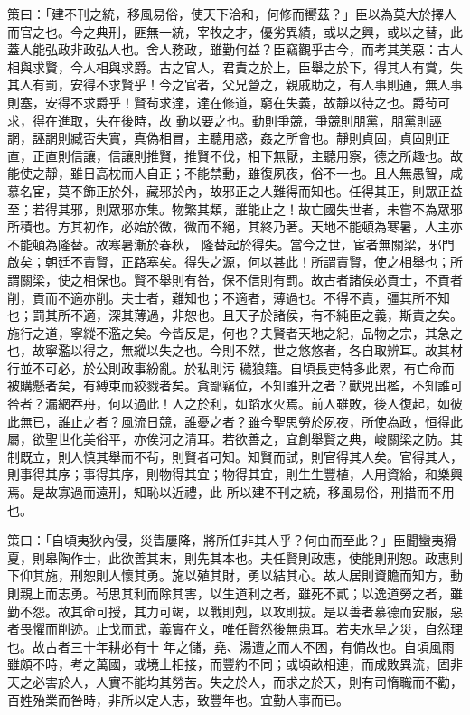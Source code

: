 \begin{pinyinscope}
 策曰：「建不刊之統，移風易俗，使天下洽和，何修而嚮茲？」臣以為莫大於擇人而官之也。今之典刑，匪無一統，宰牧之才，優劣異績，或以之興，或以之替，此蓋人能弘政非政弘人也。舍人務政，雖勤何益？臣竊觀乎古今，而考其美惡：古人相與求賢，今人相與求爵。古之官人，君責之於上，臣舉之於下，得其人有賞，失其人有罰，安得不求賢乎！今之官者，父兄營之，親戚助之，有人事則通，無人事則塞，安得不求爵乎！賢茍求達，達在修道，窮在失義，故靜以待之也。爵茍可求，得在進取，失在後時，故
 動以要之也。動則爭競，爭競則朋黨，朋黨則誣誷，誣誷則臧否失實，真偽相冒，主聽用惑，姦之所會也。靜則貞固，貞固則正直，正直則信讓，信讓則推賢，推賢不伐，相下無厭，主聽用察，德之所趣也。故能使之靜，雖日高枕而人自正；不能禁動，雖復夙夜，俗不一也。且人無愚智，咸慕名宦，莫不飾正於外，藏邪於內，故邪正之人難得而知也。任得其正，則眾正益至；若得其邪，則眾邪亦集。物繁其類，誰能止之！故亡國失世者，未嘗不為眾邪所積也。方其初作，必始於微，微而不絕，其終乃著。天地不能頓為寒暑，人主亦不能頓為隆替。故寒暑漸於春秋，
 隆替起於得失。當今之世，宦者無關梁，邪門啟矣；朝廷不責賢，正路塞矣。得失之源，何以甚此！所謂責賢，使之相舉也；所謂關梁，使之相保也。賢不舉則有咎，保不信則有罰。故古者諸侯必貢士，不貢者削，貢而不適亦削。夫士者，難知也；不適者，薄過也。不得不責，彊其所不知也；罰其所不適，深其薄過，非恕也。且天子於諸侯，有不純臣之義，斯責之矣。施行之道，寧縱不濫之矣。今皆反是，何也？夫賢者天地之紀，品物之宗，其急之也，故寧濫以得之，無縱以失之也。今則不然，世之悠悠者，各自取辨耳。故其材行並不可必，於公則政事紛亂。於私則污
 穢狼籍。自頃長吏特多此累，有亡命而被購懸者矣，有縛束而絞戮者矣。貪鄙竊位，不知誰升之者？獸兕出檻，不知誰可咎者？漏網吞舟，何以過此！人之於利，如蹈水火焉。前人雖敗，後人復起，如彼此無已，誰止之者？風流日競，誰憂之者？雖今聖思勞於夙夜，所使為政，恒得此屬，欲聖世化美俗平，亦俟河之清耳。若欲善之，宜創舉賢之典，峻關梁之防。其制既立，則人慎其舉而不茍，則賢者可知。知賢而試，則官得其人矣。官得其人，則事得其序；事得其序，則物得其宜；物得其宜，則生生豐植，人用資給，和樂興焉。是故寡過而遠刑，知恥以近禮，此
 所以建不刊之統，移風易俗，刑措而不用也。



 策曰：「自頃夷狄內侵，災眚屢降，將所任非其人乎？何由而至此？」臣聞蠻夷猾夏，則皋陶作士，此欲善其末，則先其本也。夫任賢則政惠，使能則刑恕。政惠則下仰其施，刑恕則人懷其勇。施以殖其財，勇以結其心。故人居則資贍而知方，動則親上而志勇。茍思其利而除其害，以生道利之者，雖死不貳；以逸道勞之者，雖勤不怨。故其命可授，其力可竭，以戰則剋，以攻則拔。是以善者慕德而安服，惡者畏懼而削迹。止戈而武，義實在文，唯任賢然後無患耳。若夫水旱之災，自然理也。故古者三十年耕必有十
 年之儲，堯、湯遭之而人不困，有備故也。自頃風雨雖頗不時，考之萬國，或境土相接，而豐約不同；或頃畝相連，而成敗異流，固非天之必害於人，人實不能均其勞苦。失之於人，而求之於天，則有司惰職而不勸，百姓殆業而咎時，非所以定人志，致豐年也。宜勤人事而已。




\end{pinyinscope}
